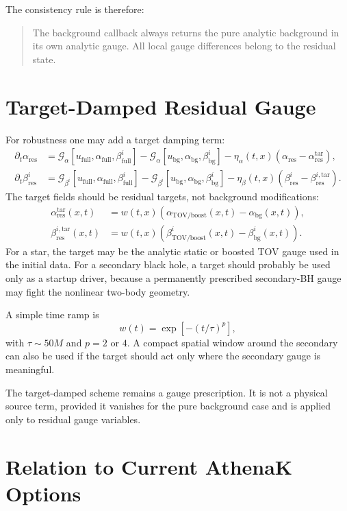 \documentclass[11pt]{article}
\newcommand{\ubg}{u_{\mathrm{bg}}}
\newcommand{\ufull}{u_{\mathrm{full}}}
\newcommand{\abg}{\alpha_{\mathrm{bg}}}
\newcommand{\ares}{\alpha_{\mathrm{res}}}
\newcommand{\afull}{\alpha_{\mathrm{full}}}
\newcommand{\bbg}{\beta^i_{\mathrm{bg}}}
\newcommand{\bres}{\beta^i_{\mathrm{res}}}
\newcommand{\bfull}{\beta^i_{\mathrm{full}}}
\newcommand{\gaugea}{\mathcal{G}_{\alpha}}
\newcommand{\gaugeb}{\mathcal{G}_{\beta^i}}
\begin{document}
The consistency rule is therefore:
\begin{quote}
The background callback always returns the pure analytic background in its
own analytic gauge.  All local gauge differences belong to the residual state.
\end{quote}

\section{Target-Damped Residual Gauge}

For robustness one may add a target damping term:
\begin{align}
  \partial_t \ares
  &=
  \gaugea[\ufull,\afull,\bfull]
  -
  \gaugea[\ubg,\abg,\bbg]
  -
  \eta_{\alpha}(t,x)\left(\ares-\ares^{\mathrm{tar}}\right),
  \label{eq:target-alpha}
  \\
  \partial_t \bres
  &=
  \gaugeb[\ufull,\afull,\bfull]
  -
  \gaugeb[\ubg,\abg,\bbg]
  -
  \eta_{\beta}(t,x)\left(\bres-\beta_{\mathrm{res}}^{i,\mathrm{tar}}\right).
  \label{eq:target-beta}
\end{align}
The target fields should be residual targets, not background modifications:
\begin{align}
  \ares^{\mathrm{tar}}(x,t) &=
  w(t,x)\left(\alpha_{\mathrm{TOV/boost}}(x,t)
  - \abg(x,t)\right),\\
  \beta_{\mathrm{res}}^{i,\mathrm{tar}}(x,t) &=
  w(t,x)\left(\beta^i_{\mathrm{TOV/boost}}(x,t)
  - \bbg(x,t)\right).
\end{align}
For a star, the target may be the analytic static or boosted TOV gauge used in
the initial data.  For a secondary black hole, a target should probably be used
only as a startup driver, because a permanently prescribed secondary-BH gauge
may fight the nonlinear two-body geometry.

A simple time ramp is
\begin{equation}
  w(t) = \exp\left[-\left(t/\tau\right)^p\right],
\end{equation}
with \(\tau \sim 50M\) and \(p=2\) or \(4\).  A compact spatial window around
the secondary can also be used if the target should act only where the
secondary gauge is meaningful.

The target-damped scheme remains a gauge prescription.  It is not a physical
source term, provided it vanishes for the pure background case and is applied
only to residual gauge variables.

\section{Relation to Current AthenaK Options}
\end{document}
